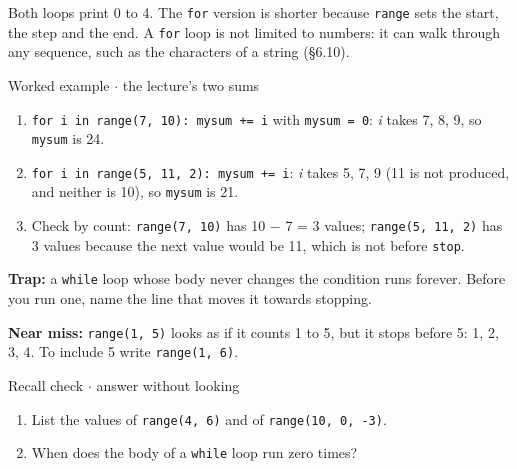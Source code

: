 \documentclass[11pt]{article}
\begin{document}
\begin{keepsection}
Both loops print 0 to 4. The \texttt{for} version is shorter because \texttt{range} sets the start, the step and the end. A \texttt{for} loop is not limited to numbers: it can walk through any sequence, such as the characters of a string (§6.10).

\begin{workedbox}{Worked example \ensuremath{\cdot} the lecture’s two sums}
\begin{enumerate}
\item \texttt{for i in range(7, 10): mysum += i} with \texttt{mysum = 0}: \textit{i} takes 7, 8, 9, so \texttt{mysum} is 24.
\item \texttt{for i in range(5, 11, 2): mysum += i}: \textit{i} takes 5, 7, 9 (11 is not produced, and neither is 10), so \texttt{mysum} is 21.
\item Check by count: \texttt{range(7, 10)} has 10 \ensuremath{-} 7 = 3 values; \texttt{range(5, 11, 2)} has 3 values because the next value would be 11, which is not before \texttt{stop}.
\end{enumerate}
\end{workedbox}

\begin{notebox}\textbf{Trap:} a \texttt{while} loop whose body never changes the condition runs forever. Before you run one, name the line that moves it towards stopping.\end{notebox}

\begin{notebox}\textbf{Near miss:} \texttt{range(1, 5)} looks as if it counts 1 to 5, but it stops before 5: 1, 2, 3, 4. To include 5 write \texttt{range(1, 6)}.\end{notebox}

\begin{recallbox}{Recall check \ensuremath{\cdot} answer without looking}
\begin{enumerate}
\item List the values of \texttt{range(4, 6)} and of \texttt{range(10, 0, -3)}.
\item When does the body of a \texttt{while} loop run zero times?
\end{enumerate}

\end{recallbox}
\end{keepsection}
\end{document}
